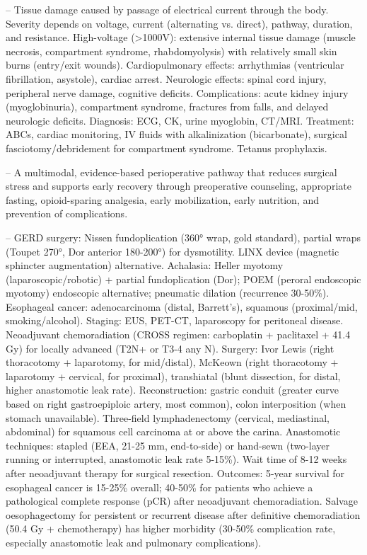 -- Tissue damage caused by passage of electrical current through the body. Severity depends on voltage, current (alternating vs. direct), pathway, duration, and resistance. High-voltage (>1000V): extensive internal tissue damage (muscle necrosis, compartment syndrome, rhabdomyolysis) with relatively small skin burns (entry/exit wounds). Cardiopulmonary effects: arrhythmias (ventricular fibrillation, asystole), cardiac arrest. Neurologic effects: spinal cord injury, peripheral nerve damage, cognitive deficits. Complications: acute kidney injury (myoglobinuria), compartment syndrome, fractures from falls, and delayed neurologic deficits. Diagnosis: ECG, CK, urine myoglobin, CT/MRI. Treatment: ABCs, cardiac monitoring, IV fluids with alkalinization (bicarbonate), surgical fasciotomy/debridement for compartment syndrome. Tetanus prophylaxis.

-- A multimodal, evidence-based perioperative pathway that reduces surgical stress and supports early recovery through preoperative counseling, appropriate fasting, opioid-sparing analgesia, early mobilization, early nutrition, and prevention of complications.

-- GERD surgery: Nissen fundoplication (360° wrap, gold standard), partial wraps (Toupet 270°, Dor anterior 180-200°) for dysmotility. LINX device (magnetic sphincter augmentation) alternative. Achalasia: Heller myotomy (laparoscopic/robotic) + partial fundoplication (Dor); POEM (peroral endoscopic myotomy) endoscopic alternative; pneumatic dilation (recurrence 30-50\%). Esophageal cancer: adenocarcinoma (distal, Barrett's), squamous (proximal/mid, smoking/alcohol). Staging: EUS, PET-CT, laparoscopy for peritoneal disease. Neoadjuvant chemoradiation (CROSS regimen: carboplatin + paclitaxel + 41.4 Gy) for locally advanced (T2N+ or T3-4 any N). Surgery: Ivor Lewis (right thoracotomy + laparotomy, for mid/distal), McKeown (right thoracotomy + laparotomy + cervical, for proximal), transhiatal (blunt dissection, for distal, higher anastomotic leak rate). Reconstruction: gastric conduit (greater curve based on right gastroepiploic artery, most common), colon interposition (when stomach unavailable). Three-field lymphadenectomy (cervical, mediastinal, abdominal) for squamous cell carcinoma at or above the carina. Anastomotic techniques: stapled (EEA, 21-25 mm, end-to-side) or hand-sewn (two-layer running or interrupted, anastomotic leak rate 5-15\%). Wait time of 8-12 weeks after neoadjuvant therapy for surgical resection. Outcomes: 5-year survival for esophageal cancer is 15-25\% overall; 40-50\% for patients who achieve a pathological complete response (pCR) after neoadjuvant chemoradiation. Salvage oesophagectomy for persistent or recurrent disease after definitive chemoradiation (50.4 Gy + chemotherapy) has higher morbidity (30-50\% complication rate, especially anastomotic leak and pulmonary complications).

